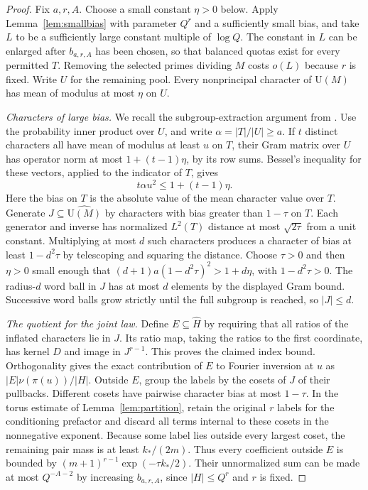 \documentclass[11pt]{article}
\newcommand{\U}{\mathrm U}
\begin{document}
\begin{proof}
Fix $a,r,A$. Choose a small constant $\eta>0$ below. Apply Lemma~\ref{lem:smallbias} with parameter $Q^r$ and a sufficiently small bias, and take $L$ to be a sufficiently large constant multiple of $\log Q$. The constant in $L$ can be enlarged after $b_{a,r,A}$ has been chosen, so that balanced quotas exist for every permitted $T$. Removing the selected primes dividing $M$ costs $o(L)$ because $r$ is fixed. Write $U$ for the remaining pool. Every nonprincipal character of $\U(M)$ has mean of modulus at most $\eta$ on $U$.

\smallskip\noindent\emph{Characters of large bias.} We recall the subgroup-extraction argument from \cite{predecessor}. Use the probability inner product over $U$, and write $\alpha=|T|/|U|\ge a$. If $t$ distinct characters all have mean of modulus at least $u$ on $T$, their Gram matrix over $U$ has operator norm at most $1+(t-1)\eta$, by its row sums. Bessel's inequality for these vectors, applied to the indicator of $T$, gives
\[
 t\alpha u^2\le1+(t-1)\eta.
\]
Here the bias on $T$ is the absolute value of the mean character value over $T$. Generate $J\subseteq\widehat{\U(M)}$ by characters with bias greater than $1-\tau$ on $T$. Each generator and inverse has normalized $L^2(T)$ distance at most $\sqrt{2\tau}$ from a unit constant. Multiplying at most $d$ such characters produces a character of bias at least $1-d^2\tau$ by telescoping and squaring the distance. Choose $\tau>0$ and then $\eta>0$ small enough that
$(d+1)a(1-d^2\tau)^2>1+d\eta$, with $1-d^2\tau>0$. The radius-$d$ word ball in $J$ has at most $d$ elements by the displayed Gram bound. Successive word balls grow strictly until the full subgroup is reached, so $|J|\le d$.

\smallskip\noindent\emph{The quotient for the joint law.} Define $E\subseteq\widehat H$ by requiring that all ratios of the inflated characters lie in $J$. Its ratio map, taking the ratios to the first coordinate, has kernel $D$ and image in $J^{r-1}$. This proves the claimed index bound. Orthogonality gives the exact contribution of $E$ to Fourier inversion at $u$ as $|E|\nu(\pi(u))/|H|$. Outside $E$, group the labels by the cosets of $J$ of their pullbacks. Different cosets have pairwise character bias at most $1-\tau$. In the torus estimate of Lemma~\ref{lem:partition}, retain the original $r$ labels for the conditioning prefactor and discard all terms internal to these cosets in the nonnegative exponent. Because some label lies outside every largest coset, the remaining pair mass is at least $k_*/(2m)$. Thus every coefficient outside $E$ is bounded by $(m+1)^{r-1}\exp(-\tau k_*/2)$. Their unnormalized sum can be made at most $Q^{-A-2}$ by increasing $b_{a,r,A}$, since $|H|\le Q^r$ and $r$ is fixed.


\end{proof}
\end{document}
